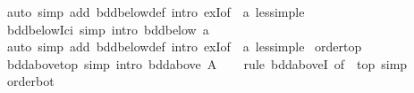 \begin{isabellebody}
\ {\isacharparenleft}{\kern0pt}auto\ simp\ add{\isacharcolon}{\kern0pt}\ bdd{\isacharunderscore}{\kern0pt}below{\isacharunderscore}{\kern0pt}def\ intro{\isacharcolon}{\kern0pt}\ exI{\isacharbrackleft}{\kern0pt}of\ {\isacharunderscore}{\kern0pt}\ a{\isacharbrackright}{\kern0pt}\ less{\isacharunderscore}{\kern0pt}imp{\isacharunderscore}{\kern0pt}le{\isacharparenright}{\kern0pt}%
\endisatagproof
{\isafoldproof}%
%
\isadelimproof
\isanewline
%
\endisadelimproof
\isanewline
{}\isamarkupfalse%
\ bdd{\isacharunderscore}{\kern0pt}below{\isacharunderscore}{\kern0pt}Ici\ {\isacharbrackleft}{\kern0pt}simp{\isacharcomma}{\kern0pt}\ intro{\isacharbrackright}{\kern0pt}{\isacharcolon}{\kern0pt}\ {\isachardoublequoteopen}bdd{\isacharunderscore}{\kern0pt}below\ {\isacharbraceleft}{\kern0pt}a\ {\isachardot}{\kern0pt}{\isachardot}{\kern0pt}{\isacharbraceright}{\kern0pt}{\isachardoublequoteclose}\isanewline
%
\isadelimproof
\ \ %
\endisadelimproof
%
\isatagproof
{}\isamarkupfalse%
\ {\isacharparenleft}{\kern0pt}auto\ simp\ add{\isacharcolon}{\kern0pt}\ bdd{\isacharunderscore}{\kern0pt}below{\isacharunderscore}{\kern0pt}def\ intro{\isacharcolon}{\kern0pt}\ exI{\isacharbrackleft}{\kern0pt}of\ {\isacharunderscore}{\kern0pt}\ a{\isacharbrackright}{\kern0pt}\ less{\isacharunderscore}{\kern0pt}imp{\isacharunderscore}{\kern0pt}le{\isacharparenright}{\kern0pt}%
\endisatagproof
{\isafoldproof}%
%
\isadelimproof
\isanewline
%
\endisadelimproof
\isanewline
{}\isamarkupfalse%
\isanewline
\isanewline
{}\isamarkupfalse%
\ order{\isacharunderscore}{\kern0pt}top\isanewline
{}\isanewline
\isanewline
{}\isamarkupfalse%
\ bdd{\isacharunderscore}{\kern0pt}above{\isacharunderscore}{\kern0pt}top\ {\isacharbrackleft}{\kern0pt}simp{\isacharcomma}{\kern0pt}\ intro{\isacharbang}{\kern0pt}{\isacharbrackright}{\kern0pt}{\isacharcolon}{\kern0pt}\ {\isachardoublequoteopen}bdd{\isacharunderscore}{\kern0pt}above\ A{\isachardoublequoteclose}\isanewline
%
\isadelimproof
\ \ %
\endisadelimproof
%
\isatagproof
{}\isamarkupfalse%
\ {\isacharparenleft}{\kern0pt}rule\ bdd{\isacharunderscore}{\kern0pt}aboveI\ {\isacharbrackleft}{\kern0pt}of\ {\isacharunderscore}{\kern0pt}\ top{\isacharbrackright}{\kern0pt}{\isacharparenright}{\kern0pt}\ simp%
\endisatagproof
{\isafoldproof}%
%
\isadelimproof
\isanewline
%
\endisadelimproof
\isanewline
{}\isamarkupfalse%
\isanewline
\isanewline
{}\isamarkupfalse%
\ order{\isacharunderscore}{\kern0pt}bot\isanewline
{}\isanewline
\isanewline

\end{isabellebody}
